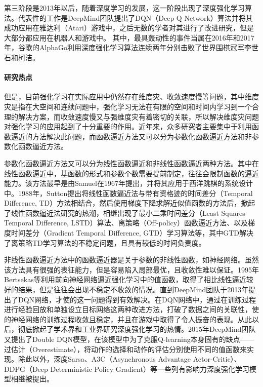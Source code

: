 第三阶段是2013年以后，随着深度学习的发展，这一阶段出现了深度强化学习算法。代表性的工作是DeepMind团队提出了DQN（Deep Q Network）算法并将其成功应用在雅达利（Atari）游戏中\citep{mnih2013playing}，之后无数的学者对其进行了改进研究，但是
大部分都应用在机器人和游戏中。
其中，最具轰动性的事件当属在2016年和2017年，谷歌的AlphaGo利用深度强化学习算法连续两年分别击败了世界围棋冠军李世石和柯洁。

\paragraph{研究热点}
但是，目前强化学习在实际应用中仍然存在维度灾、收敛速度慢等问题，其中维度灾是指在大空间和连续问题中，强化学习无法在有限的空间和时间内学习到一个合理的解决方案，而收敛速度慢又与强维度灾有着密切的关联，所以解决维度灾问题对强化学习的应用起到了十分重要的作用。近年来，众多研究者主要集中于利用函数逼近的方法解决此问题，而函数逼近方法又可以分为参数化函数逼近方法和非参数化函数逼近方法。

参数化函数逼近方法又可以分为线性函数逼近和非线性函数逼近两种方法。其中在线性函数逼近中，基函数的形式和参数个数需要提前制定，往往会限制函数的逼近能力。该方法最早是由Samuel在1967年提出，并将其应用于西洋跳棋的系统设计中\citep{samuel1959some}。1988年，Sutton提出将线性函数逼近法与带有资格迹的时间差分（Temporal Difference, TD）方法相结合，然后使用梯度下降求解近似值函数的方法后\citep{sutton1988learning}，掀起了线性函数逼近法研究的热潮，相继出现了最小二乘时间差分（Least Squares Temporal Difference, LSTD）算法\citep{bradtke1996linear}、离策略（Off-policy）函数逼近方法\citep{precup2001off}、以及梯度时间差分（Gradient Temporal Difference, GTD）学习算法\citep{sutton2009convergent}等，其中GTD解决了离策略TD学习算法的不稳定问题，且具有较低的时间负责度\citep{sutton2009convergent}。

非线性函数逼近方法中的函数逼近器是关于参数的非线性函数，如神经网络。虽然该方法具有很强的表征能力，但是容易陷入局部最优，且收敛性难以保证。1995年Bertsekas等\citep{bertsekas1995neuro}利用前向神经网络逼近强化学习中的值函数，取得了相比线性逼近较好的结果，但是往往会出现不稳定不收敛的情况。直到DeepMind团队于2013年提出了DQN网络，才使的这一问题得到有效解决。在DQN网络中，通过在训练过程进行经验回放\citep{mnih2013playing}和单独设立目标网络\citep{mnih2015human}这两种改进方法，打破了数据之间的关联性，使的神经网络的训练过程收敛且稳定，并且在游戏中取得了令人振奋的表现。从此以后，彻底掀起了学术界和工业界研究深度强化学习的热情。2015年DeepMind团队又提出了Double DQN模型，在该模型中为了克服Q-learning本身固有的缺点——过估计（Overestimate），将动作的选择和动作的评估分别使用不同的值函数来实现。除此以外，深度Sarsa、A3C（Asynchronous Advantage Actor-Critic）、DDPG（Deep Deterministic Policy Gradient）等一些列有影响力深度强化学习模型相继被提出。

